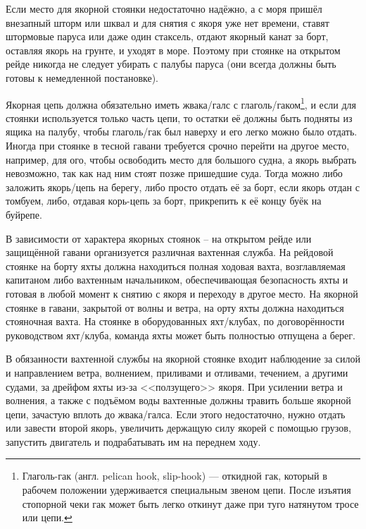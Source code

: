 Если место для якорной стоянки недостаточно надёжно, а с моря пришёл
внезапный шторм или шквал и для снятия с якоря уже нет времени, ставят
штормовые паруса или даже один стаксель, отдают якорный канат за борт,
оставляя якорь на грунте, и уходят в море. Поэтому при стоянке на
открытом рейде никогда не следует убирать с палубы паруса (они всегда
должны быть готовы к немедленной постановке).

Якорная цепь должна обязательно иметь жвака\-/галс с
глаголь\-/гаком\footnote{Глаголь-гак (англ. pelican hook, slip-hook) —
  откидной гак, который в рабочем положении удерживается специальным
  звеном цепи. После изъятия стопорной чеки гак может быть легко
  откинут даже при туго натянутом тросе или цепи.},
и если для стоянки используется только часть цепи, то остатки её
должны быть подняты из ящика на палубу, чтобы глаголь\-/гак был
наверху и его легко можно было отдать. Иногда при стоянке в тесной
гавани требуется срочно перейти на другое место, например, для ого,
чтобы освободить место для большого судна, а якорь выбрать невозможно,
так как над ним стоят позже пришедшие суда. Тогда можно либо заложить
якорь\-/цепь на берегу, либо просто отдать её за борт, если якорь
отдан с томбуем, либо, отдавая корь-цепь за борт, прикрепить к её
концу буёк на буйрепе.

В зависимости от характера якорных стоянок \--- на открытом рейде или
защищённой гавани организуется различная вахтенная служба. На рейдовой
стоянке на борту яхты должна находиться полная ходовая вахта,
возглавляемая капитаном либо вахтенным начальником, обеспечивающая
безопасность яхты и готовая в любой момент к снятию с якоря и переходу
в другое место. На якорной стоянке в гавани, закрытой от волны и
ветра, на орту яхты должна находиться стояночная вахта. На стоянке в
оборудованных яхт\-/клубах, по договорённости руководством
яхт\-/клуба, команда яхты может быть полностью отпущена а берег.

В обязанности вахтенной службы на якорной стоянке входит наблюдение за
силой и направлением ветра, волнением, приливами и отливами, течением,
а другими судами, за дрейфом яхты из-за <<ползущего>> якоря. При
усилении ветра и волнения, а также с подъёмом воды вахтенные должны
травить больше якорной цепи, зачастую вплоть до
жвака\-/галса. Если этого недостаточно, нужно отдать
или завести второй якорь, увеличить держащую силу якорей с помощью
грузов, запустить двигатель и подрабатывать им на переднем ходу.


